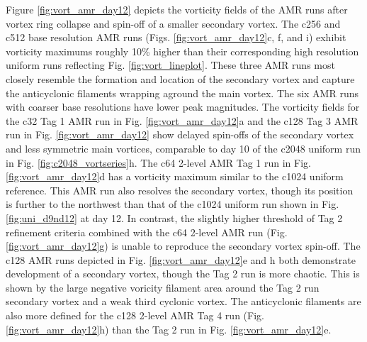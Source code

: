 Figure \ref{fig:vort_amr_day12} depicts the vorticity fields of the AMR runs after vortex ring collapse
and spin-off of a smaller secondary vortex. The c256 and c512 base resolution AMR runs (Figs.
\ref{fig:vort_amr_day12}c, f, and i) exhibit vorticity 
maximums roughly 10\% higher than their corresponding high resolution 
uniform runs reflecting Fig. \ref{fig:vort_lineplot}. These three AMR runs most closely resemble
the formation and location of the secondary vortex and capture the anticyclonic
 filaments wrapping aground the main vortex.
The six AMR runs with coarser base resolutions have lower peak magnitudes. The 
vorticity fields for the c32 Tag 1 AMR run in Fig. \ref{fig:vort_amr_day12}a and the
c128 Tag 3 AMR run in Fig. \ref{fig:vort_amr_day12} show delayed spin-offs of 
the secondary vortex and less symmetric main vortices,
comparable to day 10 of the c2048 uniform run in Fig. \ref{fig:c2048_vortseries}h.
The c64 2-level AMR Tag 1 run in Fig. \ref{fig:vort_amr_day12}d has a vorticity 
maximum similar to the c1024 uniform reference. This AMR run also resolves 
the secondary vortex, though its position is further to the northwest than that of the c1024 uniform run shown
in Fig. \ref{fig:uni_d9nd12} at day 12. In contrast,
the slightly higher threshold of Tag 2 refinement criteria 
combined with the c64 2-level AMR run (Fig. \ref{fig:vort_amr_day12}g) 
is unable to reproduce the secondary vortex spin-off. The
c128 AMR runs depicted in Fig. \ref{fig:vort_amr_day12}e and h both demonstrate development of
a secondary vortex, though the Tag 2 run is more chaotic.
This is shown by the large negative voricity filament area around the Tag 2 run secondary vortex and a weak third cyclonic vortex.
The anticyclonic filaments are also more defined for the c128 2-level AMR Tag 4 run (Fig. \ref{fig:vort_amr_day12}h)
than the Tag 2 run in Fig. \ref{fig:vort_amr_day12}e. 

